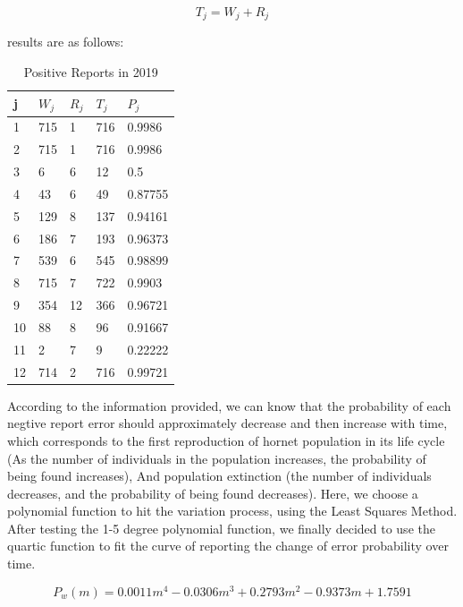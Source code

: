 \documentclass[13pt]{ctexart}
\begin{document}
$$ T_j = W_j + R_j $$

results are as follows:

\begin{table}[h]
	\centering
	\vspace{10pt}
	\setlength{\tabcolsep}{7mm}
	\begin{tabular}{lllll}
		\hline %
		j  &$W_j$&$R_j$&$T_j$&$P_j$   \\ \hline
		1  & 715 & 1  & 716 & 0.9986  \\
		2  & 715 & 1  & 716 & 0.9986  \\
		3  & 6   & 6  & 12  & 0.5     \\
		4  & 43  & 6  & 49  & 0.87755 \\
		5  & 129 & 8  & 137 & 0.94161 \\
		6  & 186 & 7  & 193 & 0.96373 \\
		7  & 539 & 6  & 545 & 0.98899 \\
		8  & 715 & 7  & 722 & 0.9903  \\
		9  & 354 & 12 & 366 & 0.96721 \\
		10 & 88  & 8  & 96  & 0.91667 \\
		11 & 2   & 7  & 9   & 0.22222 \\
		12 & 714 & 2  & 716 & 0.99721 \\ \hline
	\end{tabular}
	\caption{Positive Reports in 2019}
\end{table}

According to the information provided, we can know that the probability of each negtive report error should approximately decrease and then increase with time, which corresponds to the first reproduction of hornet population in its life cycle (As the number of individuals in the population increases, the probability of being found increases), And population extinction (the number of individuals decreases, and the probability of being found decreases). Here, we choose a polynomial function to hit the variation process, using the Least Squares Method. After testing the 1-5 degree polynomial function, we finally decided to use the quartic function to fit the curve of reporting the change of error probability over time.

\begin{equation}
	P_w(m) = 0.0011m^4 - 0.0306m^3 + 0.2793m^2 - 0.9373m + 1.7591
\end{equation}
\end{document}
